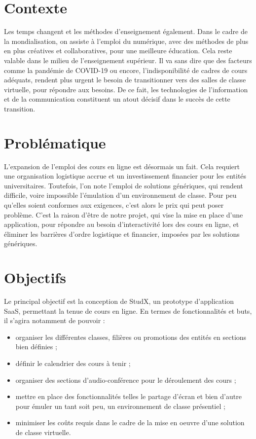 
\introduction

\thispagestyle{plain} %

\section*{Contexte}
Les temps changent et les méthodes d’enseignement également. 
Dans le cadre de la mondialisation, on assiste à l'emploi du numérique, 
avec des méthodes de plus en plus créatives et collaboratives, 
pour une meilleure éducation. Cela reste valable dans le milieu de l’enseignement supérieur.
Il va sans dire que des facteurs comme la pandémie de COVID-19 ou encore, 
l'indisponibilité de cadres de cours adéquats, 
rendent plus urgent le besoin de transitionner 
vers des salles de classe virtuelle, pour répondre aux besoins. 
De ce fait, les technologies de l’information et 
de la communication constituent un atout décisif dans le succès de cette transition.

\section*{Problématique}
L’expansion de l’emploi des cours en ligne est désormais un fait. 
Cela requiert une organisation logistique accrue et un investissement financier pour les entités universitaires. 
Toutefois, l’on note l’emploi de solutions génériques, qui rendent difficile, 
voire impossible l'émulation d’un environnement de classe. 
Pour peu qu’elles soient conformes aux exigences, c’est alors le prix qui peut poser problème. 
C’est la raison d'être de notre projet, qui vise la mise en place d’une application, 
pour répondre au besoin d'interactivité lors des cours en ligne, 
et éliminer les barrières d’ordre logistique et financier, imposées par les solutions génériques.

\section*{Objectifs}
Le principal objectif est la conception de StudX, un prototype d’application SaaS, permettant la tenue de cours en ligne.
En termes de fonctionnalités et buts, il s’agira notamment de pouvoir :
\begin{itemize}
  \item organiser les différentes classes, filières ou promotions des entités en sections bien définies ;
  \item définir le calendrier des cours à tenir ;
  \item organiser des sections d’audio-conférence pour le déroulement des cours ;
  \item mettre en place des fonctionnalités telles le partage d'écran et bien d’autre pour émuler un tant soit peu, 
    un environnement de classe présentiel ;
  \item minimiser les coûts requis dans le cadre de la mise en oeuvre d’une solution de classe virtuelle.
\end{itemize}

